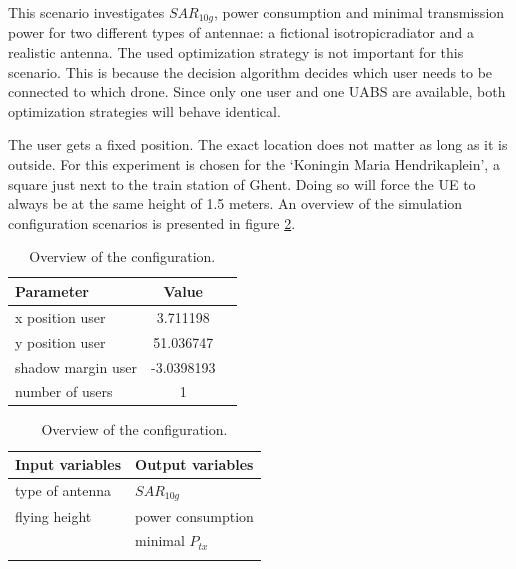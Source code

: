 This scenario investigates $SAR_{10g}$, power consumption and minimal transmission power for two different types of antennae: a 
 fictional \gls{isotropicradiator} and a realistic antenna.
 The used optimization strategy is not important
for this scenario. This is because the
 decision algorithm decides which user needs to be connected to which drone. Since only one user and one
\gls{UABS} are available, both optimization strategies will behave identical. 

The user gets a fixed position. The exact location does not matter as long as it is outside. For this experiment is chosen for the 
`Koningin Maria Hendrikaplein', a square just next to the train station of Ghent.  Doing so will force the \gls{UE} 
to always be at the same height of 1.5 meters. 
An overview of the simulation configuration scenarios is presented in figure \ref{table:confOverviewScenario1}.

\begin{table}[!htb]
    \begin{minipage}{.5\linewidth}
      \centering
        \begin{tabular}{|l|c|l|}
        \hline
        \textbf{Parameter}              & \textbf{Value}          \\   \hline 
        x position user               & 3.711198       \\    
        y position user               & 51.036747          \\ 
        shadow margin user             & -3.0398193 \\
        number of users                & 1 \\
        \hline
        \end{tabular}
    \end{minipage}%
    \begin{minipage}{.5\linewidth}
      \centering
            \begin{tabular}{|l|l|}
            \hline
            \textbf{Input variables  }              & \textbf{Output variables}          \\   \hline 
            type of antenna                & $SAR_{10g}$               \\ 
            flying height                  & power consumption             \\ 
                                           &  minimal $P_{tx}$ \\ 
                                           & \\
            \hline
            \end{tabular}
    \end{minipage} 
        \caption{Overview of the configuration.}
        \label{table:confOverviewScenario1}
\end{table}

